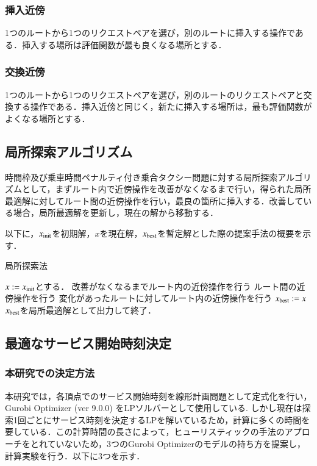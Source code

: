 \documentclass[a4j,11pt,twocolumn]{jsarticle}
\begin{document}
\subsubsection{挿入近傍}
1つのルートから1つのリクエストペアを選び，別のルートに挿入する操作である．挿入する場所は評価関数が最も良くなる場所とする．
\subsubsection{交換近傍}
1つのルートから1つのリクエストペアを選び，別のルートのリクエストペアと交換する操作である．挿入近傍と同じく，新たに挿入する場所は，最も評価関数がよくなる場所とする．
\subsection{{\large 局所探索アルゴリズム}}
時間枠及び乗車時間ペナルティ付き乗合タクシー問題に対する局所探索アルゴリズムとして，まずルート内で近傍操作を改善がなくなるまで行い，得られた局所最適解に対してルート間の近傍操作を行い，最良の箇所に挿入する．改善している場合，局所最適解を更新し，現在の解から移動する．

以下に，$x_{\rm init}$を初期解，$x$を現在解，$x_{\rm best}$を暫定解とした際の提案手法の概要を示す．
\begin{algorithm}
 \caption{局所探索法}
 \label{algo1}
 \begin{algorithmic}[1]%
  \STATE $x := x_{\rm init}$とする．
  \STATE 改善がなくなるまでルート内の近傍操作を行う
  \STATE ルート間の近傍操作を行う
  \STATE 変化があったルートに対してルート内の近傍操作を行う
  \STATE  $x_{\rm best} := x$
  \ENDIF
  \STATE $x_{\rm best}$を局所最適解として出力して終了．
 \end{algorithmic}
\end{algorithm}
\subsection{{\large 最適なサービス開始時刻決定}}
\subsubsection{{\large 本研究での決定方法}}
本研究では，各頂点でのサービス開始時刻を線形計画問題として定式化を行い，Gurobi Optimizer (ver 9.0.0) をLPソルバーとして使用している.
しかし現在は探索1回ごとにサービス時刻を決定するLPを解いているため，計算に多くの時間を要している．この計算時間の長さによって，ヒューリスティックの手法のアプローチをとれていないため，3つのGurobi Optimizerのモデルの持ち方を提案し，計算実験を行う．以下に3つを示す．
\end{document}
